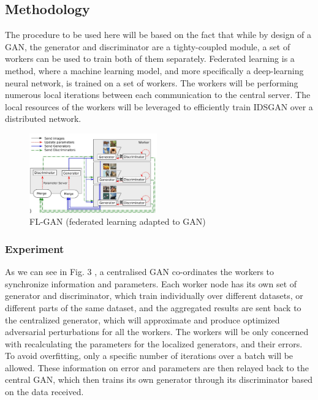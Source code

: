 \documentclass[10pt, conference, compsocconf]{IEEEtran}
\begin{document}
\subsection {Methodology}

The procedure to be used here will be based on the fact that while by design of a GAN, the generator and discriminator are a tighty-coupled module, a set of workers can be used to train both of them separately. Federated learning \cite{konecny2016fed} is a method, where a machine learning model, and more specifically a deep-learning neural network, is trained on a set of workers. The workers will be performing numerous local iterations between each communication to the central server. The local resources of the workers will be leveraged to efficiently train IDSGAN over a distributed network.

\begin{center}

\begin{figure}

\includegraphics[width=0.49\textwidth]{./images/img3.jpeg}

\caption{FL-GAN (federated learning adapted to GAN)}

\end{figure}

\end{center}
 

\subsubsection{Experiment}

As we can see in Fig. 3 \cite{corentin2018gan}, a centralised GAN co-ordinates the workers to synchronize information and parameters. Each worker node has its own set of generator and discriminator, which train individually over different datasets, or different parts of the same dataset, and the aggregated results are sent back to the centralized generator, which will approximate and produce optimized adversarial perturbations for all the workers. The workers will be only concerned with recalculating the parameters for the localized generators, and their errors. To avoid overfitting, only a specific number of iterations over a batch will be allowed. These information on error and parameters are then relayed back to the central GAN, which then trains its own generator through its discriminator based on the data received.
\end{document}
